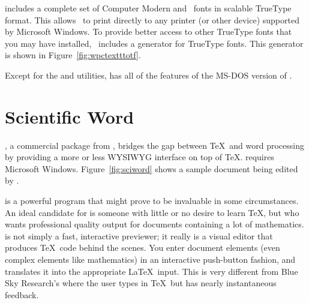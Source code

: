 
 includes a complete set of Computer Modern
and \AmS\ fonts in scalable TrueType format.  This allows \PCTeX\ to 
print directly to any printer (or other device) supported by Microsoft 
Windows.  To provide better access to other TrueType fonts that
you may have installed, \PCTeX\ includes a  generator for
TrueType fonts.  This generator is shown in Figure~\ref{fig:wpctextttotf}.


Except for the  and  utilities,
 has all of the features of the MS-DOS
version of \PCTeX.

\newpage
\section{Scientific Word}

, a commercial package from 
, bridges the gap between \TeX\ and word processing
by providing a more or less WYSIWYG interface on top of \TeX.
 requires Microsoft 
Windows.
Figure~\ref{fig:sciword} shows a sample document being edited by
.


 is a powerful program that might prove to
be invaluable in some circumstances.  An ideal candidate for 
 is someone with little or no desire to learn
\TeX, but who wants professional quality output for documents
containing a lot of mathematics.   is not simply
a fast, interactive previewer; it really is a visual editor that
produces \TeX\ code behind the scenes.  You enter document elements
(even complex elements like mathematics) in an interactive push-button
fashion, and  translates it into the appropriate
\LaTeX\ input.
This is very different
from Blue Sky Research's  where the user types in 
\TeX\ but has nearly instantaneous feedback.

